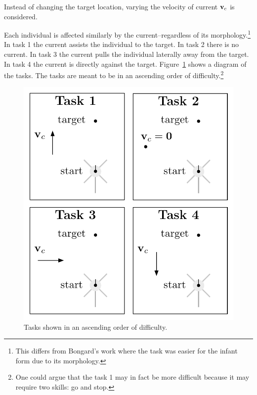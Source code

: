 Instead of changing the target location, varying the velocity of
current $\mathbf{v}_c$ is considered.  

Each individual is affected similarly by the current--regardless of
its morphology.\footnote{This differs from Bongard's work where the
  task was easier for the infant form due to its morphology.}  In task
1 the current assists the individual to the target.  In task 2 there
is no current.  In task 3 the current pulls the individual laterally
away from the target.  In task 4 the current is directly against the
target. Figure~\ref{fig:tasks} shows a diagram of the tasks.  The
tasks are meant to be in an ascending order of
difficulty.\footnote{One could argue that the task 1 may in fact be
  more difficult because it may require two skills: go and stop.}

\begin{figure}
  \centering
  \includegraphics[scale=0.8]{fig/tasks.pdf} 
  \caption[Tasks]{\label{fig:tasks}Tasks shown in an ascending order
    of difficulty.}
\end{figure} 

